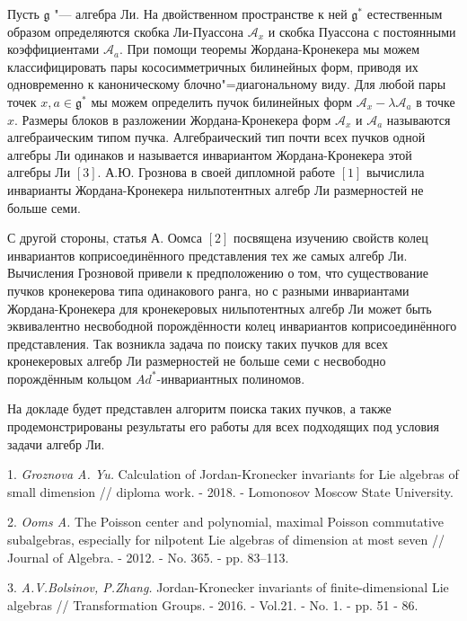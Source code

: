 

\vzmscaption



Пусть $\mathfrak{g}$ "--- алгебра Ли. На двойственном пространстве к ней $\mathfrak{g}^{\ast}$ естественным образом определяются скобка Ли-Пуассона $\mathcal{A}_{x}$ и скобка Пуассона с постоянными коэффициентами $\mathcal{A}_{a}$. При помощи теоремы Жордана-Кронекера мы можем классифицировать пары кососимметричных билинейных форм, приводя их одновременно к каноническому блочно"=диагональному виду. Для любой пары точек $x,a \in\mathfrak{g}^{\ast}$ мы можем определить пучок билинейных форм $\mathcal{A}_{x} - \lambda \mathcal{A}_{a}$ в точке $x$. Размеры блоков в разложении Жордана-Кро\-не\-ке\-ра форм $\mathcal{A}_{x}$ и $\mathcal{A}_{a}$ называются алгебраическим типом пучка. Алгебраический тип почти всех пучков одной алгебры Ли одинаков и называется инвариантом Жордана-Кронекера этой алгебры Ли $\left[ 3 \right]$. А.Ю. Грознова в своей дипломной работе $\left[ 1 \right]$ вычислила инварианты Жордана-Кронекера нильпотентных алгебр Ли размерностей не больше семи.

С другой стороны, статья А. Оомса $\left[ 2 \right] $ посвящена изучению свойств колец инвариантов коприсоединённого представления тех же самых алгебр Ли. Вычисления Грозновой привели к предположению о том, что существование пучков кронекерова типа одинакового ранга, но с разными инвариантами Жордана-Кронекера для кронекеровых нильпотентных алгебр Ли может быть эквивалентно несвободной порождённости колец инвариантов коприсоединённого представления. Так возникла задача по поиску таких пучков для всех кронекеровых алгебр Ли размерностей не больше семи с несвободно порождённым кольцом $Ad^{\ast}$-инвариантных полиномов.

На докладе будет представлен алгоритм поиска таких пучков, а также продемонстрированы результаты его работы для всех подходящих под условия задачи алгебр Ли.

\litlist


1. {\it Groznova A. Yu.}
Calculation of Jordan-Kronecker in\-va\-riants for Lie algebras of small dimension // diploma work. - 2018. - Lomonosov Moscow State University.

2. {\it Ooms A.}
The Poisson center and polynomial, maximal Poisson commutative subalgebras, especially for nilpotent Lie algebras of dimension at most seven // Journal of Algebra. - 2012. - No. 365. - pp. 83--113.

3. {\it A.V.Bolsinov, P.Zhang.}
Jordan-Kronecker invariants of finite-dimensional Lie algebras // Transformation Groups. - 2016. -   Vol.21. - No. 1. -  pp. 51 - 86.
